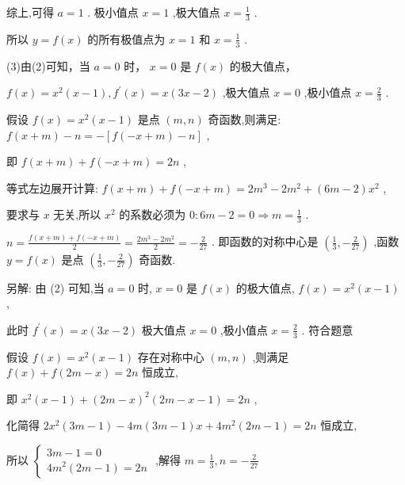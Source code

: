 \documentclass[10pt]{article}
\begin{document}
综上,可得 \(a = 1\) . 极小值点 \(x = 1\) ,极大值点 \(x = \frac{1}{3}\) .

所以 \(y = f\left( x\right)\) 的所有极值点为 \(x = 1\) 和 \(x = \frac{1}{3}\) .

(3)由(2)可知，当 \(a = 0\) 时， \(x = 0\) 是 \(f\left( x\right)\) 的极大值点，

\(f\left( x\right)  = {x}^{2}\left( {x - 1}\right) ,{f}^{\prime }\left( x\right)  = x\left( {{3x} - 2}\right)\) ,极大值点 \(x = 0\) ,极小值点 \(x = \frac{2}{3}\) .

假设 \(f\left( x\right)  = {x}^{2}\left( {x - 1}\right)\) 是点 \(\left( {m,n}\right)\) 奇函数,则满足: \(f\left( {x + m}\right)  - n =  - \left\lbrack  {f\left( {-x + m}\right)  - n}\right\rbrack\) ,

即 \(f\left( {x + m}\right)  + f\left( {-x + m}\right)  = {2n}\) ,

等式左边展开计算: \(f\left( {x + m}\right)  + f\left( {-x + m}\right)  = 2{m}^{3} - 2{m}^{2} + \left( {{6m} - 2}\right) {x}^{2}\) ,

要求与 \(x\) 无关,所以 \({x}^{2}\) 的系数必须为 \(0 : {6m} - 2 = 0 \Rightarrow  m = \frac{1}{3}\) .

\(n = \frac{f\left( {x + m}\right)  + f\left( {-x + m}\right) }{2} = \frac{2{m}^{3} - 2{m}^{2}}{2} =  - \frac{2}{27}\) . 即函数的对称中心是 \(\left( {\frac{1}{3}, - \frac{2}{27}}\right)\) ,函数 \(y = f\left( x\right)\) 是点 \(\left( {\frac{1}{3}, - \frac{2}{27}}\right)\) 奇函数.

另解: 由 (2) 可知,当 \(a = 0\) 时, \(x = 0\) 是 \(f\left( x\right)\) 的极大值点, \(f\left( x\right)  = {x}^{2}\left( {x - 1}\right)\) ,

此时 \({f}^{\prime }\left( x\right)  = x\left( {{3x} - 2}\right)\) 极大值点 \(x = 0\) ,极小值点 \(x = \frac{2}{3}\) . 符合题意

假设 \(f\left( x\right)  = {x}^{2}\left( {x - 1}\right)\) 存在对称中心 \(\left( {m,n}\right)\) ,则满足 \(f\left( x\right)  + f\left( {{2m} - x}\right)  = {2n}\) 恒成立,

即 \({x}^{2}\left( {x - 1}\right)  + {\left( 2m - x\right) }^{2}\left( {{2m} - x - 1}\right)  = {2n}\) ,

化简得 \(2{x}^{2}\left( {{3m} - 1}\right)  - {4m}\left( {{3m} - 1}\right) x + 4{m}^{2}\left( {{2m} - 1}\right)  = {2n}\) 恒成立,

所以 \(\left\{  \begin{matrix} {3m} - 1 = 0 \\  4{m}^{2}\left( {{2m} - 1}\right)  = {2n} \end{matrix}\right.\) ,解得 \(m = \frac{1}{3},n =  - \frac{2}{27}\)
\end{document}
